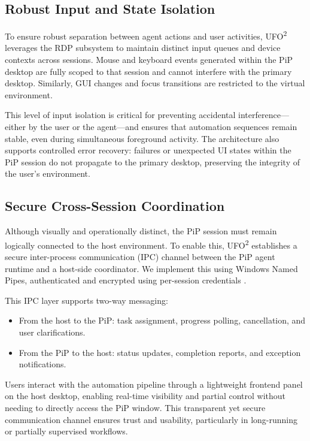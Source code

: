 \documentclass[sigplan,10pt]{acmart}
\newcommand{\name}{\textsc{UFO}\textsuperscript{2}\xspace}
\begin{document}
\subsection{Robust Input and State Isolation}

To ensure robust separation between agent actions and user activities, \name leverages the RDP subsystem to maintain distinct input queues and device contexts across sessions. Mouse and keyboard events generated within the PiP desktop are fully scoped to that session and cannot interfere with the primary desktop. Similarly, GUI changes and focus transitions are restricted to the virtual environment.

This level of input isolation is critical for preventing accidental interference—either by the user or the agent—and ensures that automation sequences remain stable, even during simultaneous foreground activity. The architecture also supports controlled error recovery: failures or unexpected UI states within the PiP session do not propagate to the primary desktop, preserving the integrity of the user's environment.

\subsection{Secure Cross-Session Coordination}
Although visually and operationally distinct, the PiP session must remain logically connected to the host environment. To enable this, \name establishes a secure inter-process communication (IPC) channel between the PiP agent runtime and a host-side coordinator. We implement this using Windows Named Pipes, authenticated and encrypted using per-session credentials \cite{venkataraman2015evaluation}.

This IPC layer supports two-way messaging:
\begin{itemize}
    \item From the host to the PiP: task assignment, progress polling, cancellation, and user clarifications.
    \item From the PiP to the host: status updates, completion reports, and exception notifications.
\end{itemize}

Users interact with the automation pipeline through a lightweight frontend panel on the host desktop, enabling real-time visibility and partial control without needing to directly access the PiP window. This transparent yet secure communication channel ensures trust and usability, particularly in long-running or partially supervised workflows.
\end{document}
